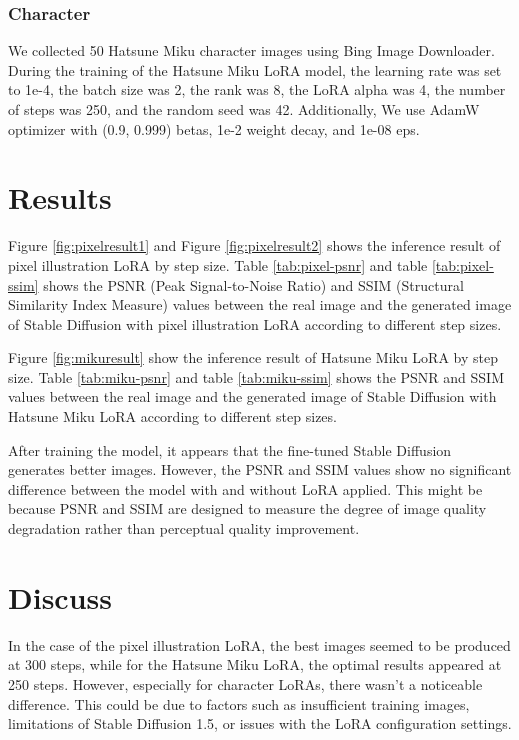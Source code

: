 \documentclass[extendedabs]{bmvc2k}
\begin{document}
\subsubsection{Character}
We collected 50 Hatsune Miku character images using Bing Image Downloader.
During the training of the Hatsune Miku LoRA model, the learning rate was set to 1e-4, the batch size was 2, the rank was 8, the LoRA alpha was 4, the number of steps was 250, and the random seed was 42. Additionally, We use AdamW\cite{adamw} optimizer with (0.9, 0.999) betas, 1e-2 weight decay, and 1e-08 eps.

\section{Results}
Figure \ref{fig:pixelresult1} and Figure \ref{fig:pixelresult2} shows the inference result of pixel illustration LoRA by step size. Table \ref{tab:pixel-psnr} and table \ref{tab:pixel-ssim} shows the PSNR (Peak Signal-to-Noise Ratio) and SSIM (Structural Similarity Index Measure) values between the real image and the generated image of Stable Diffusion with pixel illustration LoRA according to different step sizes.

Figure \ref{fig:mikuresult} show the inference result of Hatsune Miku LoRA by step size. Table \ref{tab:miku-psnr} and table \ref{tab:miku-ssim} shows the PSNR and SSIM values between the real image and the generated image of Stable Diffusion with Hatsune Miku LoRA according to different step sizes.

After training the model, it appears that the fine-tuned Stable Diffusion generates better images. However, the PSNR and SSIM values show no significant difference between the model with and without LoRA applied. This might be because PSNR and SSIM are designed to measure the degree of image quality degradation rather than perceptual quality improvement.

\section{Discuss}
In the case of the pixel illustration LoRA, the best images seemed to be produced at 300 steps, while for the Hatsune Miku LoRA, the optimal results appeared at 250 steps. However, especially for character LoRAs, there wasn't a noticeable difference. This could be due to factors such as insufficient training images, limitations of Stable Diffusion 1.5, or issues with the LoRA configuration settings.
\end{document}
